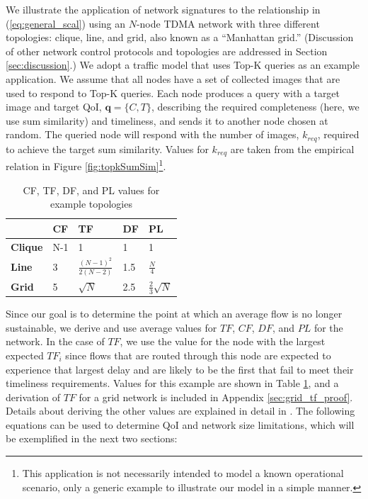 We illustrate the application of network signatures to the relationship in (\ref{eq:general_scal}) using an $N$-node TDMA network with three different topologies: clique, line, and grid, also known as a ``Manhattan grid.'' (Discussion of other network control protocols and topologies are addressed in Section \ref{sec:discussion}.)  We adopt a traffic model that uses Top-K queries as an example application.  We assume that all nodes have a set of collected images that are used to respond to Top-K queries.  Each node produces a query with a target image and target QoI, $\mathbf{q} = \{C, T\}$, describing the required completeness (here, we use sum similarity) and timeliness, and sends it to another node chosen at random.  The queried node will respond with the number of images, $k_{req}$, required to achieve the target sum similarity.  Values for $k_{req}$ are taken from the empirical relation in Figure \ref{fig:topkSumSim}\footnote{This application is not necessarily intended to model a known operational scenario, only a generic example to illustrate our model in a simple manner.}.  

\begin{table}[h]
\centering
\begin{tabular}{l|l|l|l|l|}
\cline{2-5}
                            					 & \textbf{CF}  					& \textbf{TF}   				& \textbf{DF}	& \textbf{PL} 			\\ \hline
\multicolumn{1}{|l|}{\textbf{Clique}} 	& N-1 							& 1                              		& 1  			& 1 					\\ \hline
\multicolumn{1}{|l|}{\textbf{Line}}   	& 3   							& $\frac{(N-1)^2}{2(N-2)}$ 	& 1.5 			& $\frac{N}{4}$			\\ \hline
\multicolumn{1}{|l|}{\textbf{Grid}}   	& 5   							& $\sqrt{N}$                       	&  2.5			& $\frac{2}{3} \sqrt{N}$   \\ \hline
\end{tabular}
\caption{CF, TF, DF, and PL values for example topologies}
\label{table:rf_ff_sf_values}
\vspace{-10mm}
\end{table}

Since our goal is to determine the point at which an average flow is no longer sustainable, we derive and use average values for $TF$, $CF$, $DF$, and $PL$ for the network.  In the case of $TF$, we use the value for the node with the largest expected $TF_i$ since flows that are routed through this node are expected to experience that largest delay and are likely to be the first that fail to meet their timeliness requirements.  Values for this example are shown in Table \ref{table:rf_ff_sf_values}, and a derivation of $TF$ for a grid network is included in Appendix \ref{sec:grid_tf_proof}.  Details about deriving the other values are explained in detail in \cite{symptotics_tech_report}.  The following equations can be used to determine QoI and network size limitations, which will be exemplified in the next two sections:


